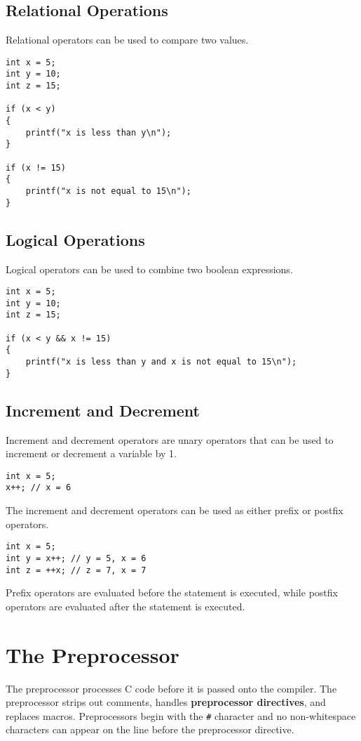 \documentclass{report}
\begin{document}
\section{Relational Operations}
Relational operators can be used to compare two values.
\begin{verbatim}
int x = 5;
int y = 10;
int z = 15;

if (x < y)
{
    printf("x is less than y\n");
}

if (x != 15)
{
    printf("x is not equal to 15\n");
}
\end{verbatim}
\section{Logical Operations}
Logical operators can be used to combine two boolean expressions.
\begin{verbatim}
int x = 5;
int y = 10;
int z = 15;

if (x < y && x != 15)
{
    printf("x is less than y and x is not equal to 15\n");
}
\end{verbatim}
\section{Increment and Decrement}
Increment and decrement operators are unary operators that can be used
to increment or decrement a variable by 1.
\begin{verbatim}
int x = 5;
x++; // x = 6
\end{verbatim}
The increment and decrement operators can be used as either prefix or
postfix operators.
\begin{verbatim}
int x = 5;
int y = x++; // y = 5, x = 6
int z = ++x; // z = 7, x = 7
\end{verbatim}
Prefix operators are evaluated before the statement is executed, while
postfix operators are evaluated after the statement is executed.
\chapter{The Preprocessor}
The preprocessor processes C code before it is passed onto the
compiler. The preprocessor strips out comments, handles
\textbf{preprocessor directives}, and replaces macros. Preprocessors
begin with the \texttt{#} character and no non-whitespace
characters can appear on the line before the preprocessor directive.
\end{document}
